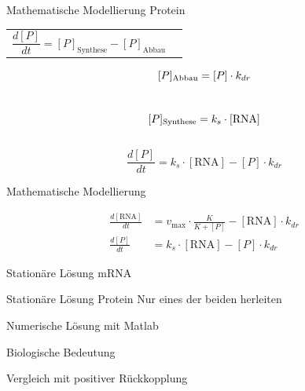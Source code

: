 \documentclass[11pt,aspectratio=169,reqno]{beamer}
\begin{document}
\begin{frame}[t]{Mathematische Modellierung Protein}
    \begin{tabular}{l l}
        $\dfrac{d[P]}{dt} =[P]_{\text{Synthese}}-{[P]_{\text{Abbau}}}$ &  \\
    \end{tabular}
    \begin{equation}\notag
        [P]_{\text{Abbau}}=[P] \cdot k_{dr}
    \end{equation}
    \\[16pt]
    \begin{equation}\notag
        [P]_{\text{Synthese}}=k_{s}\cdot[\text{RNA}]
    \end{equation}
    \\[16pt]
    \begin{equation}\tag{2}
        \frac{d[P]}{dt}=k_{s}\cdot[\text{RNA}]-[P] \cdot k_{dr}
    \end{equation}
\end{frame}

\begin{frame}{Mathematische Modellierung}

\begin{align}
    \frac{d[\text{RNA}]}{dt}&=v_{\text{max}}\cdot\frac{K}{K+[P]}-[\text{RNA}] \cdot k_{dr} \tag{1} \\[16pt]
    \frac{d[P]}{dt}&=k_{s}\cdot[\text{RNA}]-[P] \cdot k_{dr} \tag{2}
\end{align}

\end{frame}

\begin{frame}{Stationäre Lösung mRNA}\end{frame}

\begin{frame}{Stationäre Lösung Protein}
Nur eines der beiden herleiten
\end{frame}

\begin{frame}{Numerische Lösung mit Matlab}
\end{frame}

\begin{frame}{Biologische Bedeutung}
\end{frame}

\begin{frame}{Vergleich mit positiver Rückkopplung}
\end{frame}
\end{document}
